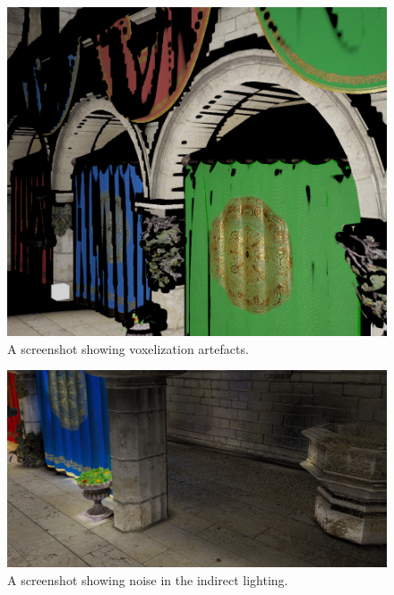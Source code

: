 \documentclass[]{acmsiggraph}
\begin{document}
\begin{figure}[htbp]\centering
\includegraphics[width=1.0\linewidth]{images/voxelization_error.png}
\caption{\label{figure:cracks}A screenshot showing voxelization artefacts.}
\end{figure}
\begin{figure}[htbp]\centering
\includegraphics[width=1.0\linewidth]{images/indirect_noise.png}
\caption{\label{figure:noise}A screenshot showing noise in the indirect lighting.}
\end{figure}
\end{document}

